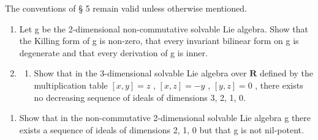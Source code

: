 
The conventions of § 5 remain valid unless otherwise mentioned.

\begin{enumerate}
\def\labelenumi{\arabic{enumi}.}
\item
  Let g be the 2-dimensional non-commutative solvable Lie algebra. Show that the Killing form of g is non-zero, that every invariant bilinear form on g is degenerate and that every derivation of g is inner.
\item
  \begin{enumerate}
  \def\labelenumii{(\alph{enumii})}
  \tightlist
  \item
    Show that in the 3-dimensional solvable Lie algebra over \(\mathbf{R}\) defined by the multiplication table \([x, y] = z\) , \([x, z] = -y\) , \([y, z] = 0\) , there exists no decreasing sequence of ideals of dimensions 3, 2, 1, 0.
  \end{enumerate}
\end{enumerate}

\begin{enumerate}
\def\labelenumi{(\alph{enumi})}
\setcounter{enumi}{1}
\tightlist
\item
  Show that in the non-commutative 2-dimensional solvable Lie algebra g there exists a sequence of ideals of dimensions 2, 1, 0 but that g is not nil-potent.
\end{enumerate}

